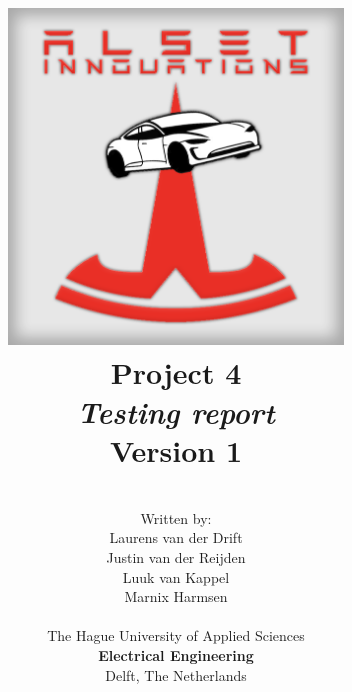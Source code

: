 \title{
\includegraphics[width=3.5in]{img/Logo/Logo.png} \\
\vspace*{1in}
\textbf{Project 4}\\
\textit{Testing report}\\
Version 1
}
\author{
\vspace*{0.5in} \\
  Written by:\\
  Laurens van der Drift\\
  Justin van der Reijden\\
  Luuk van Kappel\\
  Marnix Harmsen\\
		\vspace*{0.2in} \\
		The Hague University of Applied Sciences\\
        \textbf{Electrical Engineering}\\
        Delft, The Netherlands
       } 
